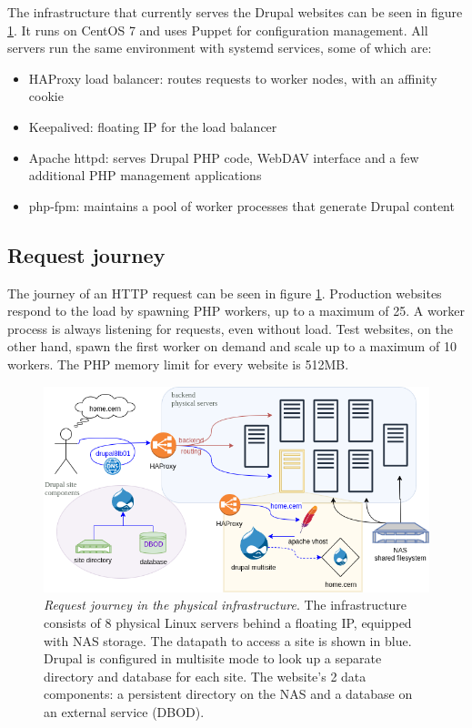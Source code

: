 The infrastructure that currently serves the Drupal websites can be seen in figure \ref{fig:drupal-physical-request-journey}.
It runs on CentOS 7 and uses Puppet for configuration management.
All servers run the same environment with systemd services, some of which are:
\begin{itemize}
    \item HAProxy load balancer: routes requests to worker nodes, with an affinity cookie
    \item Keepalived: floating IP for the load balancer
    \item Apache httpd: serves Drupal PHP code, WebDAV interface and a few additional PHP management applications
    \item php-fpm: maintains a pool of worker processes that generate Drupal content
\end{itemize}

\subsection{Request journey}

The journey of an HTTP request can be seen in figure \ref{fig:drupal-physical-request-journey}.
Production websites respond to the load by spawning PHP workers, up to a maximum of 25.
A worker process is always listening for requests, even without load.
Test websites, on the other hand, spawn the first worker on demand and scale up to a maximum of 10 workers.
The PHP memory limit for every website is 512MB.

\begin{figure}
    \vspace{-4em}
    \centering
    \hspace{-2em}
    \includegraphics[width=.66\textwidth]{figures/drupal-physical-request-journey}
    \caption{\emph{Request journey in the physical infrastructure}.
    The infrastructure consists of 8 physical Linux servers behind a floating IP, equipped with NAS storage.
    The {\color{blue} datapath} to access a site is shown in blue. 
    Drupal is configured in multisite mode to look up a separate directory and database for each site.
    The website's {\color{asparagus} 2 data components}: a persistent directory on the NAS and a database on an external service (DBOD).
    }
    \vspace{-2em}
    \label{fig:drupal-physical-request-journey}
\end{figure}

